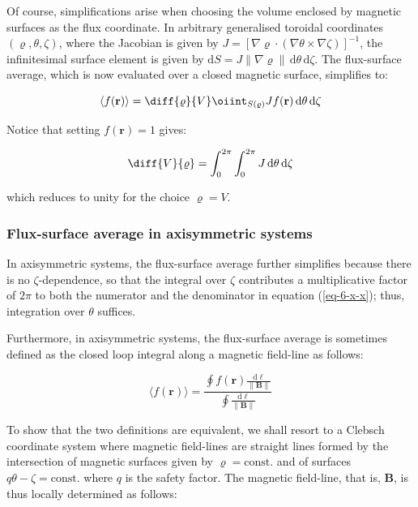 Of course, simplifications arise when choosing the volume enclosed by magnetic surfaces as the flux coordinate. In arbitrary generalised toroidal coordinates $(\varrho,\theta,\zeta)$, where the Jacobian is given by $J=\left[\nabla\varrho\cdot(\nabla\theta\times\nabla\zeta)\right]^{-1}$, the infinitesimal surface element is given by $\mathrm{d}S=J\|\nabla\varrho\|\,\mathrm{d}\theta\,\mathrm{d}\zeta$. The flux-surface average, which is now evaluated over a closed magnetic surface, simplifies to:

\begin{equation}
    \langle f(\mathbf{r})\rangle=\diff{\varrho}{V}\oiint_{S(\varrho)}Jf(\mathbf{r})\,\mathrm{d}\theta\,\mathrm{d}\zeta
\end{equation}

Notice that setting $f(\mathbf{r})=1$ gives:

\begin{equation}
    \diff{V}{\varrho}=\int_0^{2\pi}\int_{0}^{2\pi}J\,\mathrm{d}\theta\,\mathrm{d}\zeta
\end{equation}

which reduces to unity for the choice $\varrho=V$.

\subsubsection{Flux-surface average in axisymmetric systems}

In axisymmetric systems, the flux-surface average further simplifies because there is no $\zeta$-dependence, so that the integral over $\zeta$ contributes a multiplicative factor of $2\pi$ to both the numerator and the denominator in equation (\ref{eq-6-x-x}); thus, integration over $\theta$ suffices.

\quad Furthermore, in axisymmetric systems, the flux-surface average is sometimes defined as the closed loop integral along a magnetic field-line as follows:

\begin{equation}
    \langle f(\mathbf{r})\rangle=\frac{\oint f(\mathbf{r})\frac{\mathrm{d}\ell}{\|\mathbf{B}\|}}{\oint\frac{\mathrm{d}\ell}{\|\mathbf{B}\|}}
\end{equation}

To show that the two definitions are equivalent, we shall resort to a Clebsch coordinate system where magnetic field-lines are straight lines formed by the intersection of magnetic surfaces given by $\varrho=\text{const.}$ and of surfaces $q\theta-\zeta=\text{const.}$ where $q$ is the safety factor. The magnetic field-line, that is, $\mathbf{B}$, is thus locally determined as follows:

